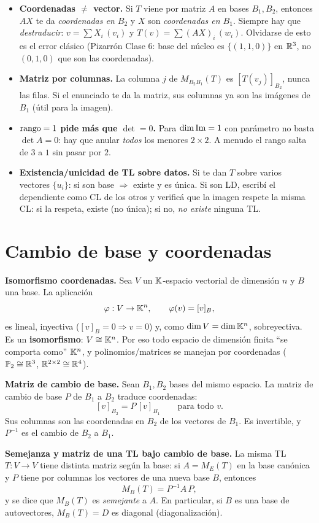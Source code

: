 \begin{truco}
\begin{itemize}
\item \textbf{Coordenadas $\neq$ vector.} Si $T$ viene por matriz $A$ en bases $B_1,B_2$, entonces $AX$ te da \emph{coordenadas en $B_2$} y $X$ son \emph{coordenadas en $B_1$}. Siempre hay que \emph{destraducir}: $v=\sum X_i\,(v_i)$ y $T(v)=\sum(AX)_i\,(w_i)$. Olvidarse de esto es el error clásico (Pizarrón Clase 6: base del núcleo es $\{(1,1,0)\}$ en $\mathbb{R}^3$, no $(0,1,0)$ que son las coordenadas).
\item \textbf{Matriz por columnas.} La columna $j$ de $M_{B_2B_1}(T)$ es $[T(v_j)]_{B_2}$, nunca las filas. Si el enunciado te da la matriz, sus columnas ya son las imágenes de $B_1$ (útil para la imagen).
\item \textbf{$\operatorname{rango}=1$ pide más que $\det=0$.} Para $\dim\operatorname{Im}=1$ con parámetro no basta $\det A=0$: hay que anular \emph{todos} los menores $2\times2$. A menudo el rango salta de $3$ a $1$ sin pasar por $2$.
\item \textbf{Existencia/unicidad de TL sobre datos.} Si te dan $T$ sobre varios vectores $\{u_i\}$: si son base $\Rightarrow$ existe y es única. Si son LD, escribí el dependiente como CL de los otros y verificá que la imagen respete la misma CL: si la respeta, existe (no única); si no, \emph{no existe} ninguna TL.
\end{itemize}
\end{truco}


\section{Cambio de base y coordenadas}

\begin{teoria}
\textbf{Isomorfismo coordenadas.} Sea $V$ un $\mathbb{K}$-espacio vectorial de dimensión $n$ y $B$ una base. La aplicación
\[
\varphi:V\to\mathbb{K}^n,\qquad \varphi(v)=[v]_B,
\]
es lineal, inyectiva ($[v]_B=0\Rightarrow v=0$) y, como $\dim V=\dim\mathbb{K}^n$, sobreyectiva. Es un \textbf{isomorfismo}: $V\cong\mathbb{K}^n$. Por eso todo espacio de dimensión finita ``se comporta como'' $\mathbb{K}^n$, y polinomios/matrices se manejan por coordenadas ($\mathbb{P}_2\cong\mathbb{R}^3$, $\mathbb{R}^{2\times2}\cong\mathbb{R}^4$).

\smallskip
\noindent\textbf{Matriz de cambio de base.} Sean $B_1,B_2$ bases del mismo espacio. La matriz de cambio de base $P$ de $B_1$ a $B_2$ traduce coordenadas:
\[
[v]_{B_2}=P\,[v]_{B_1}\qquad\text{para todo }v.
\]
Sus columnas son las coordenadas en $B_2$ de los vectores de $B_1$. Es invertible, y $P^{-1}$ es el cambio de $B_2$ a $B_1$.

\smallskip
\noindent\textbf{Semejanza y matriz de una TL bajo cambio de base.} La misma TL $T:V\to V$ tiene distinta matriz según la base: si $A=M_E(T)$ en la base canónica y $P$ tiene por columnas los vectores de una nueva base $B$, entonces
\[
M_B(T)=P^{-1}A\,P,
\]
y se dice que $M_B(T)$ es \emph{semejante} a $A$. En particular, si $B$ es una base de autovectores, $M_B(T)=D$ es diagonal (diagonalización).
\end{teoria}

